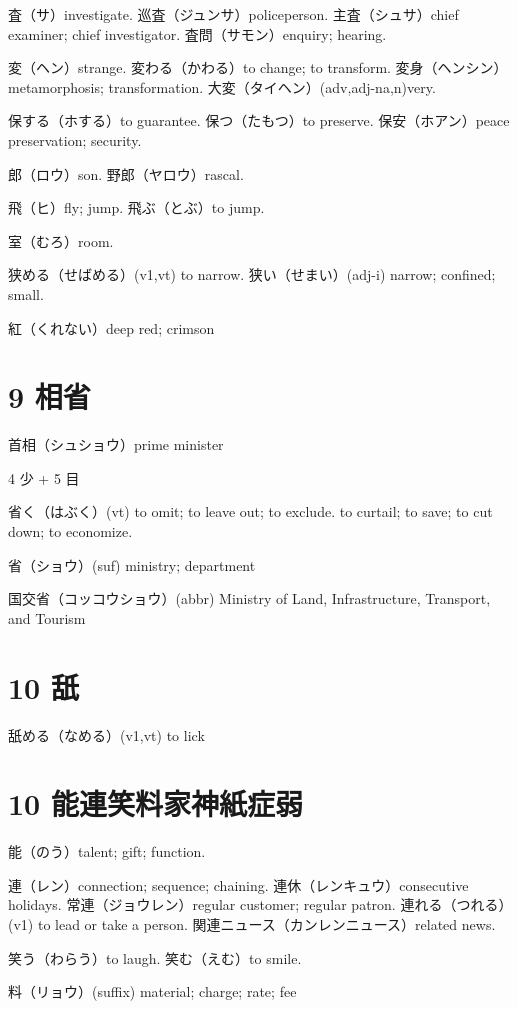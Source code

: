 査（サ）investigate.
巡査（ジュンサ）policeperson.
主査（シュサ）chief examiner; chief investigator.
査問（サモン）enquiry; hearing.

変（ヘン）strange.
変わる（かわる）to change; to transform.
変身（ヘンシン）metamorphosis; transformation.
大変（タイヘン）(adv,adj-na,n)very.

保する（ホする）to guarantee.
保つ（たもつ）to preserve.
保安（ホアン）peace preservation; security.

郎（ロウ）son.
野郎（ヤロウ）rascal.

飛（ヒ）fly; jump.
飛ぶ（とぶ）to jump.

室（むろ）room.

狭める（せばめる）(v1,vt) to narrow.
狭い（せまい）(adj-i) narrow; confined; small.

紅（くれない）deep red; crimson

\section{9 相省}

首相（シュショウ）prime minister

4 少 + 5 目

省く（はぶく）(vt)
to omit; to leave out; to exclude.
to curtail; to save; to cut down; to economize.

省（ショウ）(suf) ministry; department

国交省（コッコウショウ）(abbr)
Ministry of Land, Infrastructure, Transport, and Tourism

\section{10 舐}

舐める（なめる）(v1,vt) to lick

\section{10 能連笑料家神紙症弱}

能（のう）talent; gift; function.

連（レン）connection; sequence; chaining.
連休（レンキュウ）consecutive holidays.
常連（ジョウレン）regular customer; regular patron.
連れる（つれる）(v1) to lead or take a person.
関連ニュース（カンレンニュース）related news.

笑う（わらう）to laugh.
笑む（えむ）to smile.

料（リョウ）(suffix) material; charge; rate; fee

